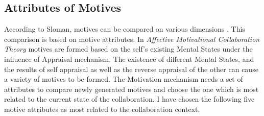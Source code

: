 \documentclass[12pt]{report}
\begin{document}
\subsection{Attributes of Motives}
\label{section-motive-attributes}

According to Sloman, motives can be compared on various dimensions
\cite{sloman:motivation}. This comparison is based on motive attributes. In
\textit{Affective Motivational Collaboration Theory} motives are formed based on
the self's existing Mental States under the influence of Appraisal mechanism. The
existence of different Mental States, and the results of self appraisal as
well as the reverse appraisal of the other can cause a variety of motives to be
formed. The Motivation mechanism needs a set of attributes to compare newly
generated motives and choose the one which is most related to the current state
of the collaboration. I have chosen the following five motive attributes as
most related to the collaboration context.
\end{document}
